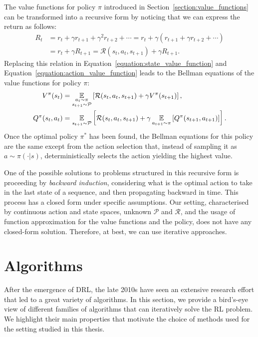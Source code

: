 The value functions for policy $\pi$ introduced in Section~\ref{section:value_functions} can be transformed into a recursive form by noticing that we can express the return as follows:
%
\begin{align*}
    R_t
    &= r_t + \gamma r_{t+1} + \gamma^2 r_{t+2} + \cdots = r_t + \gamma \left( r_{t+1} + \gamma r_{t+2} + \cdots \right) \\
    &= r_t + \gamma R_{t+1} = \mathcal{R}(s_t, a_t, s_{t+1}) + \gamma R_{t+1}.
\end{align*}
%
Replacing this relation in Equation~\eqref{equation:state_value_function} and Equation~\eqref{equation:action_value_function} leads to the Bellman equations of the value functions for policy $\pi$:
%
\begin{align*}
    V^\pi(s_t) 
    &= \operatorname*{\mathbb{E}}_{\substack{a_t \sim \pi \\ s_{t+1} \sim \mathcal{P}}} \left[ \mathcal{R}(s_t, a_t, s_{t+1}) + \gamma V^\pi(s_{t+1}) \right] ,\\
    Q^\pi(s_t, a_t) 
    &= \operatorname*{\mathbb{E}}_{s_{t+1} \sim \mathcal{P}} \left[ \mathcal{R}(s_t, a_t, s_{t+1}) + \gamma \operatorname*{\mathbb{E}}_{a_{t+1} \sim \pi} \left[  Q^\pi(s_{t+1}, a_{t+1}) \right] \right] .
\end{align*}
%
Once the optimal policy $\pi^*$ has been found, the Bellman equations for this policy are the same except from the action selection that, instead of sampling it as $a \sim \pi(\cdot|s)$, deterministically selects the action yielding the highest value.

One of the possible solutions to problems structured in this recursive form is proceeding by \emph{backward induction}, \ie considering what is the optimal action to take in the last state of a sequence, and then propagating backward in time.
This process has a closed form under specific assumptions.
Our setting, characterised by continuous action and state spaces, unknown $\mathcal{P}$ and $\mathcal{R}$, and the usage of function approximation for the value functions and the policy, does not have any closed-form solution.
Therefore, at best, we can use iterative approaches.

\section{Algorithms}

After the emergence of \acl{DRL}, the late 2010s have seen an extensive research effort that led to a great variety of algorithms.
In this section, we provide a bird's-eye view of different families of algorithms that can iteratively solve the \ac{RL} problem.
We highlight their main properties that motivate the choice of methods used for the setting studied in this thesis.

